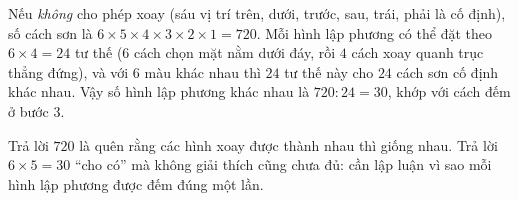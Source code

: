 {
Nếu \emph{không} cho phép xoay (sáu vị trí trên, dưới, trước, sau, trái, phải là cố định), số cách sơn là
$6\times5\times4\times3\times2\times1=720$. Mỗi hình lập phương có thể đặt theo $6\times4=24$ tư thế ($6$ cách chọn mặt nằm dưới
đáy, rồi $4$ cách xoay quanh trục thẳng đứng), và với $6$ màu khác nhau thì $24$ tư thế này cho $24$ cách sơn cố định khác nhau.
Vậy số hình lập phương khác nhau là $720:24=30$, khớp với cách đếm ở bước 3.
\begin{warnbox}Trả lời $720$ là quên rằng các hình xoay được thành nhau thì giống nhau. Trả lời $6\times5=30$ ``cho có'' mà không giải thích
cũng chưa đủ: cần lập luận vì sao mỗi hình lập phương được đếm đúng một lần.\end{warnbox}
}

